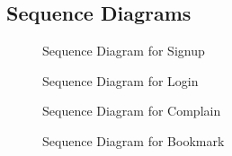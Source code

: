 \documentclass[conference]{IEEEtran}
\begin{document}
\subsection{Sequence Diagrams}
\begin{figure}[h!]
\centering
{}
\caption{Sequence Diagram for Signup}
\end{figure}
\begin{figure}[h!]
\centering
{}
\caption{Sequence Diagram for Login}
\end{figure}
\begin{figure}[h!]
\centering
{}
\caption{Sequence Diagram for Complain}
\end{figure}
\begin{figure}[h!]
\centering
{}
\caption{Sequence Diagram for Bookmark}
\end{figure}
\end{document}

